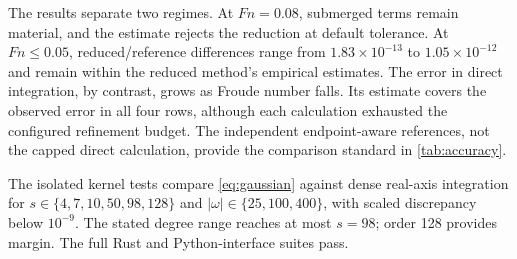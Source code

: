 \documentclass[10pt]{article}
\newcommand{\Fn}{\mathit{Fn}}
\begin{document}
The results separate two regimes.  At \(\Fn=0.08\), submerged terms remain
material, and the estimate rejects the reduction at default tolerance.  At
\(\Fn\leq0.05\), reduced/reference differences range from
\(1.83\times10^{-13}\) to \(1.05\times10^{-12}\) and remain within the reduced
method's empirical estimates.  The error in direct integration, by contrast,
grows as Froude number falls.  Its estimate covers the observed error in all
four rows, although each calculation exhausted the configured refinement
budget.  The independent endpoint-aware references, not the capped direct
calculation, provide the comparison standard in \cref{tab:accuracy}.

The isolated kernel tests compare \cref{eq:gaussian} against dense real-axis
integration for \(s\in\{4,7,10,50,98,128\}\) and
\(|\omega|\in\{25,100,400\}\), with scaled discrepancy below
\(10^{-9}\).  The stated degree range reaches at most \(s=98\); order 128
provides margin.  The full Rust and Python-interface suites pass.
\end{document}
